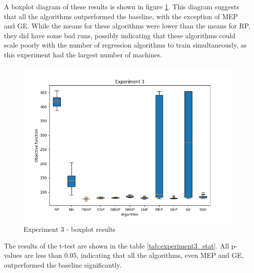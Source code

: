 A boxplot diagram of these results is shown in figure \ref{fig:experiment3}. This diagram suggests that all the algorithms outperformed the baseline, with the exception of MEP and GE. While the means for these algorithms were lower than the means for RP, they did have some bad runs, possibly indicating that these algorithms could scale poorly with the number of regression algorithms to train simultaneously, as this experiment had the largest number of machines.

\begin{figure}[!htbp]
	\centering
	\includegraphics[scale=0.7]{../images/experiment3.png}
	\caption{Experiment 3 - boxplot results}
    \label{fig:experiment3}
\end{figure}

The results of the t-test are shown in the table \ref{tab:experiment3_stat}. All p-values are less than $0.05$, indicating that all the algorithms, even MEP and GE, outperformed the baseline significantly.

